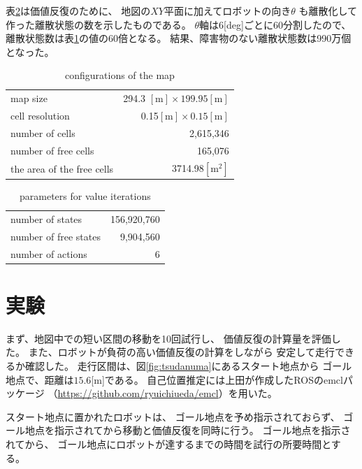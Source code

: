 \documentclass{jarticle}
\begin{document}
表\ref{table:cells}は価値反復のために、
地図の$XY$平面に加えてロボットの向き$\theta$
も離散化して作った離散状態の数を示したものである。
$\theta$軸は6[deg]ごとに60分割したので、
離散状態数は表\ref{table:map}の値の60倍となる。
結果、障害物のない離散状態数は990万個となった。

\begin{table}[bth]
  \caption{conﬁgurations of the map}
	\label{table:map}
  \centering
	\begin{small}
  \begin{tabular}{l|r}
    \hline
    map size & 294.3 $\mathrm{[m]}\times 199.95\mathrm{[m]}$\\
    cell resolution &  0.15$\mathrm{[m]}\times 0.15\mathrm{[m]}$ \\
		number of cells & 2,615,346\\
    number of free cells & 165,076\\
		the area of the free cells & 3714.98$\mathrm{[m^2]}$\\
    \hline
  \end{tabular}
	\end{small}
\end{table}

\begin{table}[bth]
	\caption{parameters for value iterations}
	\label{table:cells}
  \centering
  \begin{tabular}{l|r}
    \hline
    number of states & 156,920,760\\
    number of free states &  9,904,560\\
		number of actions & 6\\
    \hline
  \end{tabular}
\end{table}

\section{実験}%

まず、地図中での短い区間の移動を10回試行し、
価値反復の計算量を評価した。
また、ロボットが負荷の高い価値反復の計算をしながら
安定して走行できるか確認した。
走行区間は、図\ref{fig:tsudanuma}にあるスタート地点から
ゴール地点で、距離は$15.6$[m]である。
自己位置推定には上田が作成したROSのemclパッケージ
（\url{https://github.com/ryuichiueda/emcl}）を用いた。

スタート地点に置かれたロボットは、
ゴール地点を予め指示されておらず、
ゴール地点を指示されてから移動と価値反復を同時に行う。
ゴール地点を指示されてから、
ゴール地点にロボットが達するまでの時間を試行の所要時間とする。
\end{document}
